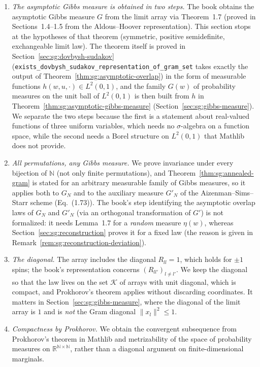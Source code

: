 \begin{remark}\label{rem:sg:asymptotic-deviation}
\begin{enumerate}
\item \emph{The asymptotic Gibbs measure is obtained in two steps.} The book obtains the asymptotic Gibbs measure $G$ from the limit array via Theorem~1.7 (proved in Sections~1.4--1.5 from the Aldous--Hoover representation).
This section stops at the hypotheses of that theorem (symmetric, positive semidefinite, exchangeable limit law). The theorem itself is proved in Section~\ref{sec:sg:dovbysh-sudakov} (\texttt{exists\_dovbysh\_sudakov\_representation\_of\_gram\_set} takes exactly the output of Theorem~\ref{thm:sg:asymptotic-overlap}) in the form of measurable functions $h(w,u,\cdot)\in L^2(0,1)$, and the family $G(w)$ of probability measures on the unit ball of $L^2(0,1)$ is then built from $h$ in Theorem~\ref{thm:sg:asymptotic-gibbs-measure} (Section~\ref{sec:sg:gibbs-measure}). We separate the two steps because the first is a statement about real-valued functions of three uniform variables, which needs no $\sigma$-algebra on a function space, while the second needs a Borel structure on $L^2(0,1)$ that Mathlib does not provide.
\item \emph{All permutations, any Gibbs measure.} We prove invariance under every bijection of $\mathbb N$ (not only finite permutations), and Theorem~\ref{thm:sg:annealed-gram} is stated for an arbitrary measurable family of Gibbs measures, so it applies both to $G_N$
and to the auxiliary measure $G'_N$ of the Aizenman--Sims--Starr scheme (Eq.~(1.73)). The book's step identifying the asymptotic overlap laws of $G_N$ and $G'_N$ (via an orthogonal transformation of $G'$) is not formalized: it needs Lemma~1.7 for a \emph{random} measure $\eta(w)$, whereas Section~\ref{sec:sg:reconstruction} proves it for a fixed law (the reason is given in Remark~\ref{rem:sg:reconstruction-deviation}).
\item \emph{The diagonal.} The array includes the diagonal $R_{ll}=1$, which holds for $\pm1$ spins; the book's representation concerns $(R_{ll'})_{l\ne l'}$. We keep the diagonal so that the law lives on the set $\mathcal K$ of arrays with unit diagonal, which is compact, and Prokhorov's theorem applies without discarding coordinates. It matters in Section~\ref{sec:sg:gibbs-measure}, where the diagonal of the limit array is $1$ and is \emph{not} the Gram diagonal $\|x_l\|^2\le1$.
\item \emph{Compactness by Prokhorov.} We obtain the convergent subsequence from Prokhorov's theorem in Mathlib and metrizability of the space of probability measures on $\mathbb R^{\mathbb N\times\mathbb N}$, rather than a diagonal argument on finite-dimensional marginals.
\end{enumerate}
\end{remark}

